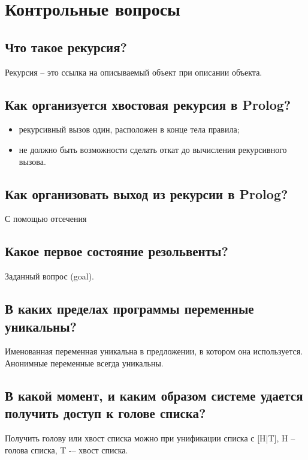 \section*{Контрольные вопросы}

\subsection*{Что такое рекурсия?}

Рекурсия – это ссылка на описываемый объект при описании объекта.

\subsection*{Как организуется хвостовая рекурсия в Prolog?}

\begin{itemize}
    \item рекурсивный вызов один, расположен в конце тела правила;
    \item не должно быть возможности сделать откат до вычисления рекурсивного вызова.
\end{itemize}

\subsection*{Как организовать выход из рекурсии в Prolog?}

С помощью отсечения

\subsection*{Какое первое состояние резольвенты?}

Заданный вопрос (goal).

\subsection*{В каких пределах программы переменные уникальны?}

Именованная переменная уникальна в предложении, в котором она используется. Анонимные переменные всегда уникальны.

\subsection*{В какой момент, и каким образом системе удается получить доступ к голове списка?}

Получить голову или хвост списка можно при унификации списка с [H|T], H -- голова списка, T -– хвост списка.

